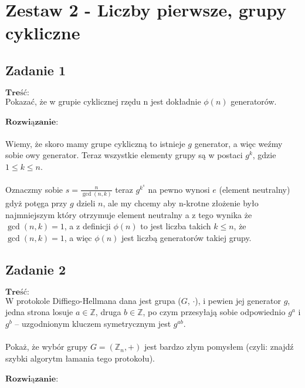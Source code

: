\section{Zestaw 2 - Liczby pierwsze, grupy cykliczne}
\subsection{Zadanie 1}
$\textbf{Treść:}$  \\ \newline
Pokazać, że w grupie cyklicznej rzędu n jest dokładnie $\phi(n)$ generatorów.
\\
\\
$\textbf{Rozwiązanie:}$ \\
\\
Wiemy, że skoro mamy grupe cykliczną to istnieje $g$ generator, a więc weźmy sobie owy generator. Teraz wszystkie elementy grupy są w postaci $g^{k}$, gdzie $1 \leq k \leq n$.
\\
\\
Oznaczmy sobie $s = \frac{n}{\gcd(n,k)}$ teraz $g^{k^{s}}$ na pewno wynosi $e$ (element neutralny) gdyż potęga przy $g$ dzieli $n$, ale my chcemy aby n-krotne złożenie było najmniejszym który otrzymuje element neutralny a z tego wynika że $\gcd(n,k) = 1$, a z definicji $\phi(n)$ to jest liczba takich $k \leq n$, że $\gcd(n,k) = 1$, a więc $\phi(n)$ jest liczbą generatorów takiej grupy.\\



\subsection{Zadanie 2}
$\textbf{Treść:}$ \\ \newline
W protokole Diffiego-Hellmana dana jest grupa ($G$, $\cdot$), i pewien jej generator
$g$, jedna strona losuje $a \in \mathbb{Z}$, druga $b \in \mathbb{Z}$, po czym przesyłają sobie odpowiednio $g^{a}$
i $g^{b}$ – uzgodnionym kluczem symetrycznym jest $g^{ab}$.
\\
\\
Pokaż, że wybór grupy $G = (\mathbb{Z}_{n}, +)$ jest bardzo złym pomysłem (czyli: znajdź szybki algorytm łamania tego protokołu).
\\
\\
$\textbf{Rozwiązanie:}$ \\


